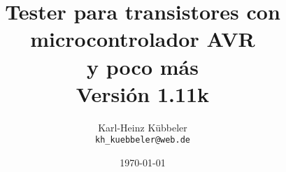 \documentclass[12pt,a4paper,oneside,english]{report}
\begin{document}
\title{Tester para transistores con microcontrolador AVR \\
y poco más\\
Versión 1.11k \\
}
\author{Karl-Heinz K\"ubbeler\\
\texttt{kh\_kuebbeler@web.de}}
\date{\today}
\maketitle
\tableofcontents













 
 
 
 
 
 





\end{document}
